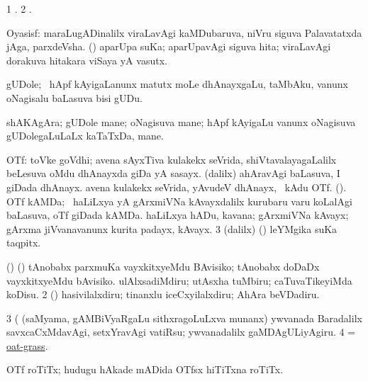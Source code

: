 \bentry
{}
\gl{\saMkiSx}
\bmng
\bnum
\num{1} . 
\num{2} . 
\enum
\emng
\eentry

\bentry
{}
\gl{\nA}
\bmng
Oyasisf: 
\banum
{} maraLugADinalilx viraLavAgi kaMDubaruva, niVru siguva Palavatatxda jAga, parxdeVsha. 
 (\rUpa) aparUpa suKa; aparUpavAgi siguva hita; viraLavAgi dorakuva hitakara viSaya yA vasutx. 
\eanum
\emng
\eentry

\bentry
{}
\gl{\nA}
\bmng
gUDole; \kanmu\ hApf kAyigaLanunx matutx moLe dhAnayxgaLu, taMbAku, \mo vanunx oNagisalu baLasuva bisi gUDu. 
\emng
\eentry

\bentry
{}
\gl{\nA}
\bmng
shAKAgAra; gUDole mane; oNagisuva mane; hApf kAyigaLu \mo vanunx oNagisuva gUDolegaLuLaLx kaTaTxDa, mane. 
\emng
\eentry

\bentry
{}
\gl{\nA}
\bmng
\bnum
{} OTf: 
\banum
{} toVke goVdhi; avena sAyxTiva kulakekx seVrida, shiVtavalayagaLalilx beLesuva oMdu dhAnayxda giDa yA sasayx. 
 (\bava dalilx) ahAravAgi baLasuva, I giDada dhAnayx. 
 avena kulakekx seVrida, yAvudeV dhAnayx, \kanmu\ kAdu OTf. 
\eanum
\numie
{} (\kAparx). 
\banum
{} OTf kAMDa; \sA\ haLiLxya yA gArxmiVNa kAvayxdalilx kurubaru \mo varu koLalAgi baLasuva, oTf giDada kAMDa. 
 haLiLxya hADu, kavana; gArxmiVNa kAvayx; gArxma jiVvanavanunx kurita padayx, kAvayx. 
\eanum
\numie
\num{3} (\bava dalilx) (\ashi) leYMgika suKa taqpitx. 
\enum
\emng

\noindent
\gl{\pagu}
\bmng
{} 
\bnum
{}  (\AmA) 
\banum
{} (\ame) tAnobabx parxmuKa vayxkitxyeMdu BAvisiko; tAnobabx doDaDx vayxkitxyeMdu bAvisiko. 
 ulAlxsadiMdiru; utAsxha tuMbiru; caTuvaTikeyiMda koDisu. 
\eanum
\numie
\num{2}  (\AmA) hasivilalxdiru; tinanxlu iceCxyilalxdiru; AhAra beVDadiru. 
\num{3}  (  (saMyama, gAMBiVyaRgaLu sithxragoLuLxva munanx) ywvanada Baradalilx savxcaCxMdavAgi, setxYravAgi vatiRsu; ywvanadalilx gaMDAgULiyAgiru. 
\num{4}  = \hyperlink{oat-grass}{oat-grass}. 
\enum
\emng
\eentry

\bentry
{}
\gl{\nA}
\bmng
OTf roTiTx; hudugu hAkade mADida OTfsx hiTiTxna roTiTx. 
\emng
\eentry

